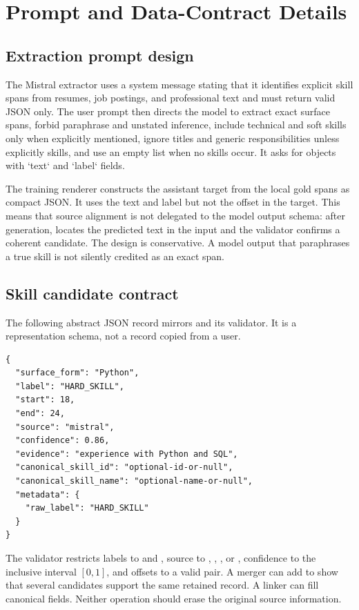 \chapter{Prompt and Data-Contract Details}
\label{app:prompt-schema}

\section{Extraction prompt design}

The Mistral extractor uses a system message stating that it identifies explicit skill spans from resumes, job postings, and professional text and must return valid JSON only. The user prompt then directs the model to extract exact surface spans, forbid paraphrase and unstated inference, include technical and soft skills only when explicitly mentioned, ignore titles and generic responsibilities unless explicitly skills, and use an empty list when no skills occur. It asks for objects with `text` and `label` fields.

The training renderer constructs the assistant target from the local gold spans as compact JSON. It uses the text and label but not the offset in the target. This means that source alignment is not delegated to the model output schema: after generation,  locates the predicted text in the input and the validator confirms a coherent candidate. The design is conservative. A model output that paraphrases a true skill is not silently credited as an exact span.

\section{Skill candidate contract}

The following abstract JSON record mirrors  and its validator. It is a representation schema, not a record copied from a user.

\begin{verbatim}
{
  "surface_form": "Python",
  "label": "HARD_SKILL",
  "start": 18,
  "end": 24,
  "source": "mistral",
  "confidence": 0.86,
  "evidence": "experience with Python and SQL",
  "canonical_skill_id": "optional-id-or-null",
  "canonical_skill_name": "optional-name-or-null",
  "metadata": {
    "raw_label": "HARD_SKILL"
  }
}
\end{verbatim}

The validator restricts labels to  and , source to , , , or , confidence to the inclusive interval $[0,1]$, and offsets to a valid pair. A merger can add  to show that several candidates support the same retained record. A linker can fill canonical fields. Neither operation should erase the original source information.

